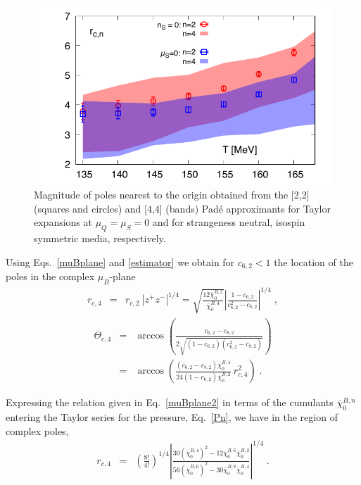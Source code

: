\documentclass[pdflatex,prd,twocolumn,showpacs,superscriptaddress,nofootinbib]{revtex4-1}
\newcommand \cb {\bar{\chi}}
\begin{document}
\begin{figure}[t]
	\begin{center}
\includegraphics[scale=0.72]{fig/mercer_roberts_estimator.pdf}
\end{center}
\caption{Magnitude of poles
nearest to the origin obtained from the [2,2] (squares and circles) and [4,4] (bands) Pad\'e approximants for
Taylor expansions at $\mu_Q=\mu_S=0$ and for strangeness neutral, isospin symmetric media, respectively.}
\label{fig:dist}
\end{figure}

Using Eqs.~\ref{muBplane} and \ref{estimator} we obtain for $c_{6,2} < 1$ the location of the poles in the
complex $\mu_B$-plane
\begin{eqnarray}
    r_{c,4} &=& r_{c,2}\ |z^+ z^-|^{1/4} 
    = \sqrt{\frac{12 \cb_0^{B,2}}{\cb_0^{B,4}}}  
    \left| 
    \frac{1-c_{6,2}}{c_{6,2}^2-c_{8,2}}\right|^{1/4}  \; ,\label{muBplane2} 
    \end{eqnarray}
    \begin{eqnarray}
    \Theta_{c,4} &=& \arccos\left(\frac{c_{6,2}-c_{8,2}}{2\sqrt{(1-c_{6,2})(c_{6,2}^2-c_{8,2})}}\right) \nonumber \\
    &=& \arccos\left(\frac{(c_{6,2}-c_{8,2})\cb_0^{B,4} }{24 (1-c_{6,2}) \cb_0^{B,2}}\ r_{c,4}^2 \right)
    \; .
    \label{muBtheta}
\end{eqnarray}

Expressing the relation given in Eq.~\ref{muBplane2}
in terms of the cumulants $\cb_0^{B,n}$ entering the Taylor series 
for the pressure, Eq.~\ref{Pn}, we have in the region of complex poles,
\begin{eqnarray}
 r_{c,4}	
&=&\left( \frac{8!}{4!}\right)^{1/4} 
	\left| \frac{30(\cb_0^{B,4})^2-12\cb_0^{B,6}\cb_0^{B,2}}{56(\cb_0^{B,6})^2-30\cb_0^{B,8}\cb_0^{B,4}} \right|^{1/4} \; .
\label{rcMR8}
	 \end{eqnarray}
\end{document}
